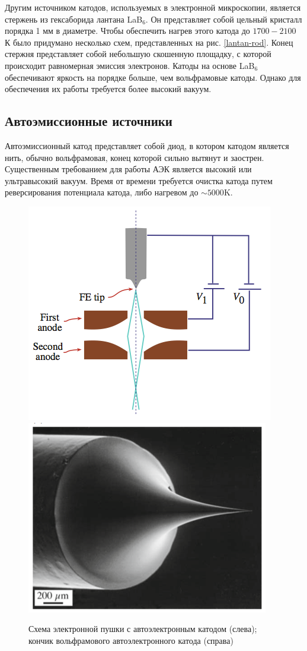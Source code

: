 \documentclass[12pt]{article}
\begin{document}
Другим источником катодов, используемых в электронной микроскопии, является стержень из гексаборида лантана LaB$_6$. Он представляет собой цельный кристалл порядка 1 мм в диаметре. Чтобы обеспечить нагрев этого катода до $1700-2100$\, К было придумано несколько схем, представленных на рис. \ref{lantan-rod}. Конец стержня представляет собой небольшую скошенную площадку, с которой происходит равномерная эмиссия электронов. Катоды на основе LaB$_6$ обеспечивают яркость на порядке больше, чем вольфрамовые катоды. Однако для обеспечения их работы требуется более высокий вакуум.

\clearpage
\subsection*{Автоэмиссионные источники}

Автоэмиссионный катод представляет собой диод, в котором катодом является нить, обычно вольфрамовая, конец которой сильно вытянут и заострен. Существенным требованием для работы АЭК является высокий или ультравысокий вакуум. Время от времени требуется очистка катода путем реверсирования потенциала катода, либо нагревом до $\sim 5000$K.

\begin{figure}
\includegraphics[width=0.5\linewidth]{pictures/feg1.png}
\includegraphics[width=0.5\linewidth]{pictures/feg2.png}
\caption{Схема электронной пушки с автоэлектронным катодом (слева); кончик вольфрамового  автоэлектронного катода (справа)}
\end{figure}
\end{document}
